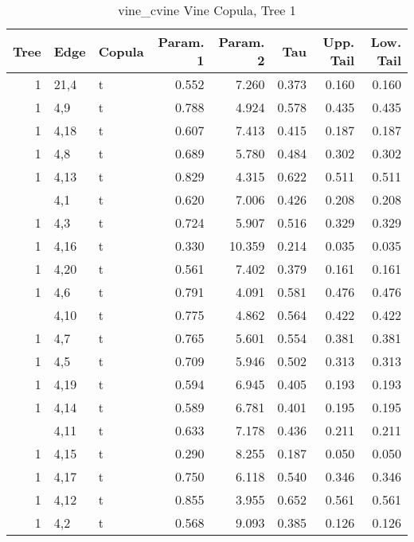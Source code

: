 \begin{table}

\caption{vine_cvine Vine Copula, Tree 1}
\centering
\begin{tabular}[t]{rllrrrrr}
\toprule
Tree & Edge & Copula & Param. 1 & Param. 2 & Tau & Upp. Tail & Low. Tail\\
\midrule
1 & 21,4 & t & 0.552 & 7.260 & 0.373 & 0.160 & 0.160\\
1 & 4,9 & t & 0.788 & 4.924 & 0.578 & 0.435 & 0.435\\
1 & 4,18 & t & 0.607 & 7.413 & 0.415 & 0.187 & 0.187\\
1 & 4,8 & t & 0.689 & 5.780 & 0.484 & 0.302 & 0.302\\
1 & 4,13 & t & 0.829 & 4.315 & 0.622 & 0.511 & 0.511\\
\addlinespace
1 & 4,1 & t & 0.620 & 7.006 & 0.426 & 0.208 & 0.208\\
1 & 4,3 & t & 0.724 & 5.907 & 0.516 & 0.329 & 0.329\\
1 & 4,16 & t & 0.330 & 10.359 & 0.214 & 0.035 & 0.035\\
1 & 4,20 & t & 0.561 & 7.402 & 0.379 & 0.161 & 0.161\\
1 & 4,6 & t & 0.791 & 4.091 & 0.581 & 0.476 & 0.476\\
\addlinespace
1 & 4,10 & t & 0.775 & 4.862 & 0.564 & 0.422 & 0.422\\
1 & 4,7 & t & 0.765 & 5.601 & 0.554 & 0.381 & 0.381\\
1 & 4,5 & t & 0.709 & 5.946 & 0.502 & 0.313 & 0.313\\
1 & 4,19 & t & 0.594 & 6.945 & 0.405 & 0.193 & 0.193\\
1 & 4,14 & t & 0.589 & 6.781 & 0.401 & 0.195 & 0.195\\
\addlinespace
1 & 4,11 & t & 0.633 & 7.178 & 0.436 & 0.211 & 0.211\\
1 & 4,15 & t & 0.290 & 8.255 & 0.187 & 0.050 & 0.050\\
1 & 4,17 & t & 0.750 & 6.118 & 0.540 & 0.346 & 0.346\\
1 & 4,12 & t & 0.855 & 3.955 & 0.652 & 0.561 & 0.561\\
1 & 4,2 & t & 0.568 & 9.093 & 0.385 & 0.126 & 0.126\\
\bottomrule
\end{tabular}
\end{table}
